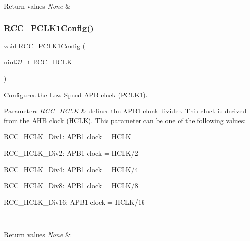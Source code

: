 \begin{DoxyRetVals}{Return values}
{\em None} & \\
\hline
\end{DoxyRetVals}
\mbox{\label{group___r_c_c___private___functions_ga448137346d4292985d4e7a61dd1a824f}} 
\subsubsection{\texorpdfstring{RCC\_PCLK1Config()}{RCC\_PCLK1Config()}}
{\footnotesize\ttfamily void R\+C\+C\+\_\+\+P\+C\+L\+K1\+Config (\begin{DoxyParamCaption}\item[{uint32\+\_\+t}]{R\+C\+C\+\_\+\+H\+C\+LK }\end{DoxyParamCaption})}



Configures the Low Speed A\+PB clock (P\+C\+L\+K1). 


\begin{DoxyParams}{Parameters}
{\em R\+C\+C\+\_\+\+H\+C\+LK} & defines the A\+P\+B1 clock divider. This clock is derived from the A\+HB clock (H\+C\+LK). This parameter can be one of the following values\+: \begin{DoxyItemize}
\item R\+C\+C\+\_\+\+H\+C\+L\+K\+\_\+\+Div1\+: A\+P\+B1 clock = H\+C\+LK \item R\+C\+C\+\_\+\+H\+C\+L\+K\+\_\+\+Div2\+: A\+P\+B1 clock = H\+C\+L\+K/2 \item R\+C\+C\+\_\+\+H\+C\+L\+K\+\_\+\+Div4\+: A\+P\+B1 clock = H\+C\+L\+K/4 \item R\+C\+C\+\_\+\+H\+C\+L\+K\+\_\+\+Div8\+: A\+P\+B1 clock = H\+C\+L\+K/8 \item R\+C\+C\+\_\+\+H\+C\+L\+K\+\_\+\+Div16\+: A\+P\+B1 clock = H\+C\+L\+K/16 \end{DoxyItemize}
\\
\hline
\end{DoxyParams}

\begin{DoxyRetVals}{Return values}
{\em None} & \\
\hline
\end{DoxyRetVals}
\mbox{\label{group___r_c_c___private___functions_ga09f9c010a4adca9e036da42c2ca6126a}} 
